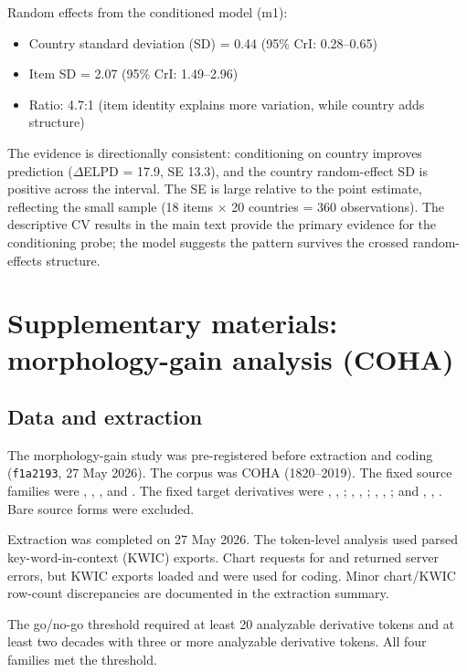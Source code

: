 \documentclass[12pt]{article}
\begin{document}
Random effects from the conditioned model (m1):
\begin{itemize}
  \item Country standard deviation (SD) = 0.44 (95\% CrI: 0.28--0.65)
  \item Item SD = 2.07 (95\% CrI: 1.49--2.96)
  \item Ratio: 4.7:1 (item identity explains more variation, while
    country adds structure)
\end{itemize}

The evidence is directionally consistent: conditioning on country
improves prediction ($\Delta$ELPD = 17.9, SE 13.3), and the country
random-effect SD is positive across the interval. The SE is large
relative to the point estimate, reflecting the small sample (18 items $\times$ 20
countries = 360 observations). The descriptive CV results in the main
text provide the primary evidence for the conditioning probe; the model
suggests the pattern survives the crossed random-effects structure.

\section[Morphology gain in COHA]{Supplementary materials: morphology-gain analysis (COHA)}
\label{app:morphgain}

\subsection{Data and extraction}

The morphology-gain study was pre-registered before extraction and
coding (\texttt{f1a2193}, 27 May 2026). The corpus was COHA
(1820--2019). The fixed source families were ,
, , and . The fixed target
derivatives were , , ;
, , ; ,
, ; and ,
, . Bare source forms were excluded.

Extraction was completed on 27 May 2026. The token-level analysis used
parsed key-word-in-context (KWIC) exports. Chart requests for
 and  returned server errors, but KWIC
exports loaded and were used for coding. Minor chart/KWIC row-count discrepancies are
documented in the extraction summary.

The go/no-go threshold required at least 20 analyzable derivative tokens
and at least two decades with three or more analyzable derivative
tokens. All four families met the threshold.
\end{document}
